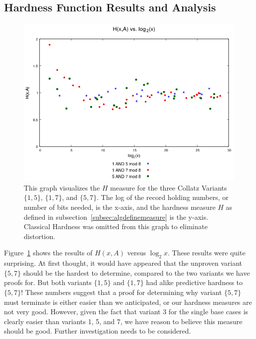 \subsection{Hardness Function Results and Analysis} \label{subsubsec:algmulhardness}
\begin{figure}
    \centering
    \includegraphics[scale=0.6]{ModAvoidanceAnalysisPics/H_vs_log_multi_base.png}
    \caption{This graph visualizes the $H$ measure for the three Collatz Variants $\{1,5\}$, $\{1,7\}$, and $\{5,7\}$. The log of the record holding numbers, or number of bits needed, is the x-axis, and the hardness measure $H$ as defined in subsection~\ref{subsec:algdefinemeasure} is the y-axis. Classical Hardness was omitted from this graph to eliminate distortion.}
    \label{fig:h_multivslog}
\end{figure}
Figure~\ref{fig:h_multivslog} shows the results of $H(x,A)$ versus $\log_2{x}$. These results were quite surprising. At first thought, it would have appeared that the unproven variant $\{5, 7\}$ should be the hardest to determine, compared to the two variants we have proofs for. But both variants $\{1, 5\}$ and $\{1, 7\}$  had alike predictive hardness to $\{5, 7\}$! These numbers suggest that a proof for determining why variant $\{5, 7\}$ must terminate is either easier than we anticipated, or our hardness measures are not very good. However, given the fact that variant 3 for the single base cases is clearly easier than variants 1, 5, and 7, we have reason to believe this measure should be good. Further investigation needs to be considered.
